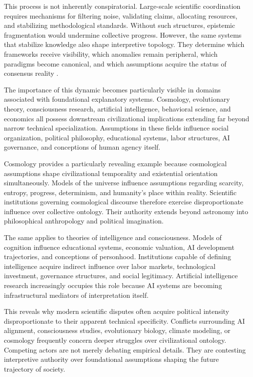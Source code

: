 \documentclass[11pt,a4paper]{article}
\begin{document}
This process is not inherently conspiratorial. Large-scale scientific coordination requires mechanisms for filtering noise, validating claims, allocating resources, and stabilizing methodological standards. Without such structures, epistemic fragmentation would undermine collective progress. However, the same systems that stabilize knowledge also shape interpretive topology. They determine which frameworks receive visibility, which anomalies remain peripheral, which paradigms become canonical, and which assumptions acquire the status of consensus reality \cite{winner1980}.

The importance of this dynamic becomes particularly visible in domains associated with foundational explanatory systems. Cosmology, evolutionary theory, consciousness research, artificial intelligence, behavioral science, and economics all possess downstream civilizational implications extending far beyond narrow technical specialization. Assumptions in these fields influence social organization, political philosophy, educational systems, labor structures, AI governance, and conceptions of human agency itself.

Cosmology provides a particularly revealing example because cosmological assumptions shape civilizational temporality and existential orientation simultaneously. Models of the universe influence assumptions regarding scarcity, entropy, progress, determinism, and humanity's place within reality. Scientific institutions governing cosmological discourse therefore exercise disproportionate influence over collective ontology. Their authority extends beyond astronomy into philosophical anthropology and political imagination.

The same applies to theories of intelligence and consciousness. Models of cognition influence educational systems, economic valuation, AI development trajectories, and conceptions of personhood. Institutions capable of defining intelligence acquire indirect influence over labor markets, technological investment, governance structures, and social legitimacy. Artificial intelligence research increasingly occupies this role because AI systems are becoming infrastructural mediators of interpretation itself.

This reveals why modern scientific disputes often acquire political intensity disproportionate to their apparent technical specificity. Conflicts surrounding AI alignment, consciousness studies, evolutionary biology, climate modeling, or cosmology frequently concern deeper struggles over civilizational ontology. Competing actors are not merely debating empirical details. They are contesting interpretive authority over foundational assumptions shaping the future trajectory of society.
\end{document}
